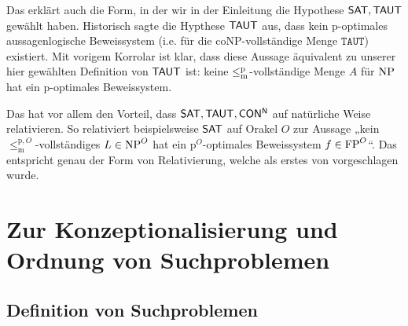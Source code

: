 Das erklärt auch die Form, in der wir in der Einleitung die Hypothese $\mathsf{SAT}, \mathsf{TAUT}$ gewählt haben.
Historisch sagte die Hypthese $\mathsf{TAUT}$ aus, dass kein p-optimales aussagenlogische Beweissystem (i.e. für die coNP-vollständige Menge $\mathtt{TAUT}$) existiert.
Mit vorigem Korrolar ist klar, dass diese Aussage äquivalent zu unserer hier gewählten Definition von $\mathsf{TAUT}$ ist: keine $\leq_\mathrm{m}^\mathrm{p}$-vollständige Menge $A$ für $\mathrm{NP}$ hat ein p-optimales Beweissystem.
%

Das hat vor allem den Vorteil, dass $\mathsf{SAT}, \mathsf{TAUT}, \mathsf{CON^N}$ auf natürliche Weise relativieren.
So relativiert beispielsweise $\mathsf{SAT}$ auf Orakel $O$ zur Aussage „kein $\leq_\mathrm{m}^{\mathrm p,O}$-vollständiges $L\in\mathrm{NP}^O$ hat ein p${}^O$-optimales Beweissystem $f\in\mathrm{FP}^O$“.
Das entspricht genau der Form von Relativierung, welche als erstes von \textcite{dose_oracle_2020} vorgeschlagen wurde.


\chapter{Zur Konzeptionalisierung und Ordnung von Suchproblemen}


\section{Definition von Suchproblemen}

